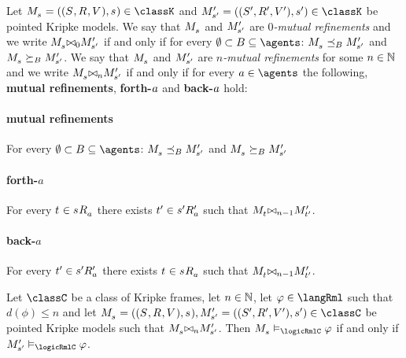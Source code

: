 \begin{definition}
    Let $\kPModelAndTuple{\kStateS} \in \classK$ and $\kPModelAndTupleP{\kStateSP} \in \classK$ be pointed Kripke models.
    We say that $\kPModel{\kStateS}$ and ${M^{\prime}_{{s}^{\prime}}}$ are {\em $0$-mutual refinements}
    and we write $\kPModel{\kStateS} \bisimref[0] \kPModelP{\kStateSP}$
    if and only if for every $\emptyset \subset \agentsB \subseteq \agents$: 
    $\kPModel{\kStateS} \refinesBs \kPModelP{\kStateSP}$ 
    and $\kPModel{\kStateS} \simulatesBs \kPModelP{\kStateSP}$.
    We say that $\kPModel{\kStateS}$ and ${M^{\prime}_{{s}^{\prime}}}$ are {\em $n$-mutual refinements}
    for some $n \in \mathbb{N}$
    and we write $\kPModel{\kStateS} \bisimref[n] \kPModelP{\kStateSP}$
    if and only if for every $\agentA \in \agents$
    the following, {\bf mutual refinements}, {\bf forth-$a$} and {\bf back-$a$} hold:
    
    \paragraph{mutual refinements} 
    For every $\emptyset \subset \agentsB \subseteq \agents$:
    $\kPModel{\kStateS} \refinesBs \kPModelP{\kStateSP}$ 
    and $\kPModel{\kStateS} \simulatesBs \kPModelP{\kStateSP}$ 

    \paragraph{forth-$a$} For every $\kStateT \in \kStateS \kAccessibility{\agentA}$ 
    there exists ${t}^{\prime} \in {s}^{\prime} {R^{\prime}_{a}}$
    such that $\kPModel{\kStateT} \bisimref[n-1] \kPModelP{\kStateTP}$.

    \paragraph{back-$a$} For every ${t}^{\prime} \in {s}^{\prime} {R^{\prime}_{a}}$
    there exists $\kStateT \in \kStateS \kAccessibility{\agentA}$ 
    such that $\kPModel{\kStateT} \bisimref[n-1] \kPModelP{\kStateTP}$.
\end{definition}

\begin{lemma}
    Let $\classC$ be a class of Kripke frames,
    let $n \in \mathbb{N}$,
    let $\phi \in \langRml$ such that $d(\phi) \leq n$
    and let $\kPModelAndTuple{\kStateS}, \kPModelAndTupleP{\kStateSP} \in \classC$ be pointed Kripke models
    such that $\kPModel{\kStateS} \bisimref[n] \kPModelP{\kStateSP}$.
    Then $\kPModel{\kStateS} \entails_\logicRmlC \phi$ if and only if $\kPModelP{\kStateSP} \entails_\logicRmlC \phi$.
\end{lemma}

